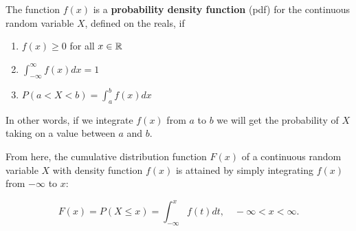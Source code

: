 \documentclass{article}
\begin{document}
\begin{definition}
The \@{function} $f(x)$ is a \textbf{probability density function} (pdf) for the \@{continuous random variable} $X$, defined on the \@{reals}, if

\begin{enumerate}
\item $f(x) \geq 0$ for all $x \in \mathbb{R}$
\item $\int_{-\infty}^{\infty} f(x) dx = 1 $
\item $P(a < X < b) = \int_{a}^{b} f(x) dx$
\end{enumerate}
\end{definition}

In other words, if we integrate $f(x)$ from $a$ to $b$ we will get the \@{probability} of $X$ taking on a value between $a$ and $b$.

From here, the \@{cumulative distribution function} $F(x)$ of a \@{continuous random variable} $X$ with density function $f(x)$ is attained by simply integrating $f(x)$ from $-\infty$ to $x$:

\[ F(x) = P(X \leq x) = \int_{-\infty}^{x} f(t)dt, \quad -\infty < x < \infty. \]
\end{document}
